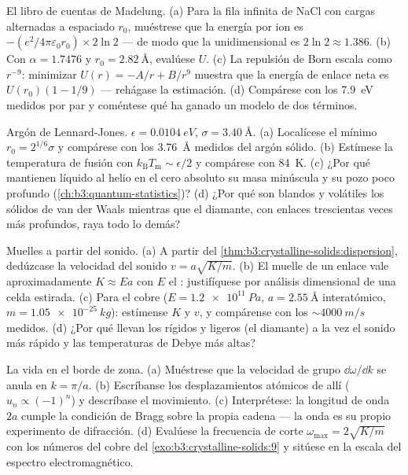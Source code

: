 \begin{exercise}[$\star\star$]\label{exo:b3:crystalline-solids:7}
El libro de cuentas de Madelung. (a) Para la fila infinita de NaCl con cargas
alternadas a espaciado $r_0$, muéstrese que la energía por ion es
$-(e^2/4\pi\varepsilon_0r_0)\times2\ln2$ --- de modo que la
 unidimensional es $2\ln2 \approx 1.386$. (b)
Con $\alpha = 1.7476$ y $r_0 = \qty{2.82}{\angstrom}$, evalúese
$U$. (c) La repulsión de Born escala como $r^{-9}$: minimizar
$U(r) = -A/r + B/r^9$ muestra que la energía de enlace neta es $U(r_0)(1 - 1/9)$
--- rehágase la estimación. (d) Compárese con los \qty{7.9}{eV}
medidos por par y coméntese qué ha ganado un modelo de dos términos.
\end{exercise}

\begin{exercise}[$\star\star$]\label{exo:b3:crystalline-solids:8}
Argón de Lennard-Jones. $\epsilon = \qty{0.0104}{eV}$, $\sigma =
\qty{3.40}{\angstrom}$. (a) Localícese el mínimo $r_0 = 2^{1/6}
\sigma$ y compárese con los \qty{3.76}{\angstrom} medidos
del argón sólido. (b) Estímese la temperatura de fusión con
$k_{\text{B}}T_{\text{m}} \sim \epsilon/2$ y compárese con
\qty{84}{K}. (c) ¿Por qué mantienen líquido al helio en el cero absoluto su
masa minúscula y su pozo poco profundo (\cref{ch:b3:quantum-statistics})? (d)
¿Por qué son blandos y volátiles los sólidos de van der Waals mientras que el diamante,
con enlaces trescientas veces más profundos, raya todo lo demás?
\end{exercise}

\begin{exercise}[$\star\star$]\label{exo:b3:crystalline-solids:9}
Muelles a partir del sonido. (a) A partir del
\cref{thm:b3:crystalline-solids:dispersion}, dedúzcase la velocidad
del sonido $v = a\sqrt{K/m}$. (b) El muelle de un enlace vale aproximadamente $K \approx
Ea$ con $E$ el : justifíquese por análisis dimensional de
una celda estirada. (c) Para el cobre ($E = \qty{1.2e11}{Pa}$,
$a = \qty{2.55}{\angstrom}$ interatómico, $m =
\qty{1.05e-25}{kg}$): estímense $K$ y $v$, y compárense con los
$\sim\qty{4000}{m/s}$ medidos. (d) ¿Por qué llevan los  rígidos y ligeros
(el diamante) a la vez el sonido más rápido y las temperaturas de Debye
más altas?
\end{exercise}

\begin{exercise}[$\star\star\star$]\label{exo:b3:crystalline-solids:10}
La vida en el borde de zona. (a) Muéstrese que la velocidad de grupo
$\dd\omega/\dd k$ se anula en $k = \pi/a$. (b) Escríbanse los desplazamientos
atómicos de allí ($u_n \propto (-1)^n$) y descríbase el
movimiento. (c) Interprétese: la longitud de onda $2a$ cumple la
condición de Bragg sobre la propia cadena --- la onda es su propio experimento
de difracción. (d) Evalúese la frecuencia de corte
$\omega_{\text{max}} = 2\sqrt{K/m}$ con los números del cobre del
\cref{exo:b3:crystalline-solids:9} y sitúese en la escala del
espectro electromagnético.
\end{exercise}


